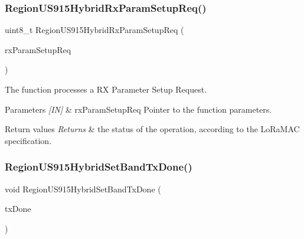 \subsubsection{\texorpdfstring{Region\+U\+S915\+Hybrid\+Rx\+Param\+Setup\+Req()}{RegionUS915HybridRxParamSetupReq()}}
{\footnotesize\ttfamily uint8\+\_\+t Region\+U\+S915\+Hybrid\+Rx\+Param\+Setup\+Req (\begin{DoxyParamCaption}\item[{\hyperlink{group__REGION_ga7165f282c670c728c36d534df2285157}{Rx\+Param\+Setup\+Req\+Params\+\_\+t} $\ast$}]{rx\+Param\+Setup\+Req }\end{DoxyParamCaption})}



The function processes a RX Parameter Setup Request. 


\begin{DoxyParams}{Parameters}
{\em \mbox{[}\+I\+N\mbox{]}} & rx\+Param\+Setup\+Req Pointer to the function parameters.\\
\hline
\end{DoxyParams}

\begin{DoxyRetVals}{Return values}
{\em Returns} & the status of the operation, according to the Lo\+Ra\+M\+AC specification. \\
\hline
\end{DoxyRetVals}
\mbox{\label{group__REGIONUS915HYB_gaffb1cec48663f7fc2d7aeae9411e3d76}} 
\subsubsection{\texorpdfstring{Region\+U\+S915\+Hybrid\+Set\+Band\+Tx\+Done()}{RegionUS915HybridSetBandTxDone()}}
{\footnotesize\ttfamily void Region\+U\+S915\+Hybrid\+Set\+Band\+Tx\+Done (\begin{DoxyParamCaption}\item[{\hyperlink{group__REGION_gad0524aa0673c0814a71e7a4f9cade3fc}{Set\+Band\+Tx\+Done\+Params\+\_\+t} $\ast$}]{tx\+Done }\end{DoxyParamCaption})}



